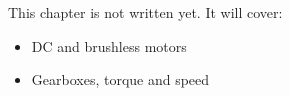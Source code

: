 \label{ch:hw5}
\begin{keyidea}
This chapter is not written yet. It will cover:
\begin{itemize}[nosep]
  \item DC and brushless motors
  \item Gearboxes, torque and speed
\end{itemize}
\end{keyidea}
